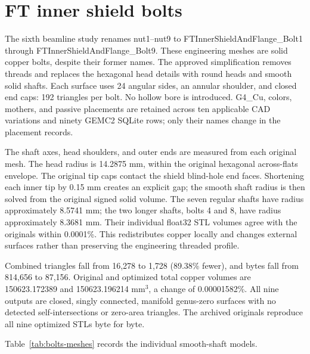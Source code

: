 \FloatBarrier
\section{FT inner shield bolts}

The sixth beamline study renames nut1--nut9 to FTInnerShieldAndFlange\_Bolt1 through
FTInnerShieldAndFlange\_Bolt9. These engineering meshes are solid copper bolts, despite their former names.
The approved simplification removes threads and replaces the hexagonal head details with round heads and
smooth solid shafts. Each surface uses 24 angular sides, an annular shoulder, and closed end caps: 192
triangles per bolt. No hollow bore is introduced. G4\_Cu, colors, mothers, and passive placements are
retained across ten applicable CAD variations and ninety GEMC2 SQLite rows; only their names change in the
placement records.

The shaft axes, head shoulders, and outer ends are measured from each original mesh. The head radius is
14.2875 mm, within the original hexagonal across-flats envelope. The original tip caps contact the shield
blind-hole end faces. Shortening each inner tip by 0.15 mm creates an explicit gap; the smooth shaft radius
is then solved from the original signed solid volume. The seven regular shafts have radius approximately
8.5741 mm; the two longer shafts, bolts 4 and 8, have radius approximately 8.3681 mm. Their individual
float32 STL volumes agree with the originals within 0.0001\%. This redistributes copper locally and changes
external surfaces rather than preserving the engineering threaded profile.

Combined triangles fall from 16,278 to 1,728 (89.38\% fewer), and bytes fall from 814,656 to 87,156.
Original and optimized total copper volumes are 150623.172389 and 150623.196214 mm$^3$, a change of
0.00001582\%. All nine outputs are closed, singly connected, manifold genus-zero surfaces with no detected
self-intersections or zero-area triangles. The archived originals reproduce all nine optimized STLs byte for
byte.

Table~\ref{tab:bolts-meshes} records the individual smooth-shaft models.

